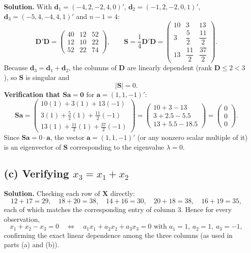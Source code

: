 \documentclass[11pt]{article}
\newcommand{\bX}{\mathbf{X}}
\newcommand{\bS}{\mathbf{S}}
\newcommand{\ba}{\mathbf{a}}
\newcommand{\bd}{\mathbf{d}}
\newcommand{\bD}{\mathbf{D}}
\newenvironment{sol}{\par\noindent\textbf{Solution.}\quad}{\par\medskip}
\begin{document}
\begin{sol}
With $\bd_1=(-4,2,-2,4,0)'$, $\bd_2=(-1,2,-2,0,1)'$, $\bd_3=(-5,4,-4,4,1)'$ and $n-1=4$:
\[
\bD'\bD = \begin{pmatrix} 40 & 12 & 52 \\ 12 & 10 & 22 \\ 52 & 22 & 74\end{pmatrix}, \qquad
\bS = \frac14\bD'\bD = \begin{pmatrix} 10 & 3 & 13 \\ 3 & \dfrac52 & \dfrac{11}{2} \\ 13 & \dfrac{11}{2} & \dfrac{37}{2}\end{pmatrix}.
\]
Because $\bd_3=\bd_1+\bd_2$, the columns of $\bD$ are linearly dependent (rank $\bD\le2<3$), so $\bS$ is singular and
\[
|\bS| = 0.
\]
\textbf{Verification that $\bS\ba=\mathbf 0$} for $\ba=(1,1,-1)'$:
\[
\bS\ba = \begin{pmatrix} 10(1)+3(1)+13(-1) \\ 3(1)+\tfrac52(1)+\tfrac{11}{2}(-1) \\ 13(1)+\tfrac{11}{2}(1)+\tfrac{37}{2}(-1)\end{pmatrix}
= \begin{pmatrix} 10+3-13 \\ 3+2.5-5.5 \\ 13+5.5-18.5\end{pmatrix}
= \begin{pmatrix}0\\0\\0\end{pmatrix}.
\]
Since $\bS\ba = 0\cdot\ba$, the vector $\ba=(1,1,-1)'$ (or any nonzero scalar multiple of it) is an eigenvector of $\bS$ corresponding to the eigenvalue $\lambda=0$.
\end{sol}

\subsection*{(c) Verifying $x_3 = x_1+x_2$}

\begin{sol}
Checking each row of $\bX$ directly:
\[
12+17=29,\quad 18+20=38,\quad 14+16=30,\quad 20+18=38,\quad 16+19=35,
\]
each of which matches the corresponding entry of column 3. Hence for every observation,
\[
x_1 + x_2 - x_3 = 0 \quad\Longleftrightarrow\quad a_1 x_1+a_2x_2+a_3x_3=0 \text{ with } a_1=1,\ a_2=1,\ a_3=-1,
\]
confirming the exact linear dependence among the three columns (as used in parts (a) and (b)).
\end{sol}
\end{document}
